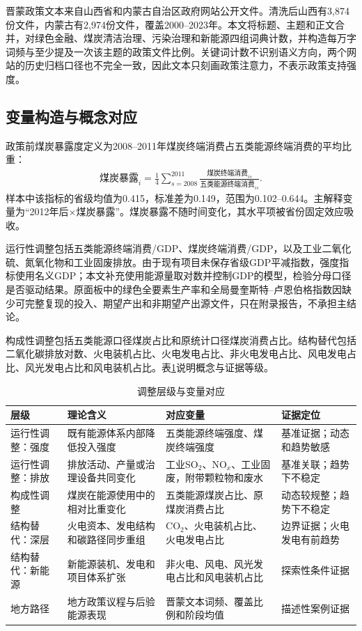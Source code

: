 \documentclass[UTF8,12pt]{ctexart}
\begin{document}
晋蒙政策文本来自山西省和内蒙古自治区政府网站公开文件。清洗后山西有3,874份文件，内蒙古有2,974份文件，覆盖2000--2023年。本文将标题、主题和正文合并，对绿色金融、煤炭清洁治理、污染治理和新能源四组词典计数，并构造每万字词频与至少提及一次该主题的政策文件比例。关键词计数不识别语义方向，两个网站的历史归档口径也不完全一致，因此文本只刻画政策注意力，不表示政策支持强度。

\subsection{变量构造与概念对应}

政策前煤炭暴露度定义为2008--2011年煤炭终端消费占五类能源终端消费的平均比重：
\begin{equation}
\begin{aligned}
\text{煤炭暴露}_{i}
  =\frac{1}{4}\sum_{s=2008}^{2011}
  \frac{\text{煤炭终端消费}_{is}}
  {\text{五类能源终端消费}_{is}}.
\end{aligned}
\end{equation}
样本中该指标的省级均值为0.415，标准差为0.149，范围为0.102--0.644。主解释变量为“2012年后×煤炭暴露”。煤炭暴露不随时间变化，其水平项被省份固定效应吸收。

运行性调整包括五类能源终端消费/GDP、煤炭终端消费/GDP，以及工业二氧化硫、氮氧化物和工业固废排放。由于现有项目未保存省级GDP平减指数，强度指标使用名义GDP；本文补充使用能源量取对数并控制GDP的模型，检验分母口径是否驱动结果。原面板中的绿色全要素生产率和全局曼奎斯特--卢恩伯格指数因缺少可完整复现的投入、期望产出和非期望产出源文件，只在附录报告，不承担主结论。

构成性调整包括五类能源口径煤炭占比和原统计口径煤炭消费占比。结构替代包括二氧化碳排放对数、火电装机占比、火电发电占比、非火电发电占比、风电发电占比、风光发电占比和风电装机占比。表\ref{tab:mapping}说明概念与证据等级。

\begin{table}[H]
\centering
\caption{调整层级与变量对应}
\label{tab:mapping}
\begin{tabularx}{\textwidth}{p{2.7cm}p{4.5cm}X p{2.5cm}}
\toprule
层级 & 理论含义 & 对应变量 & 证据定位 \\
\midrule
运行性调整：强度 & 既有能源体系内部降低投入强度 & 五类能源终端强度、煤炭终端强度 & 基准证据；动态和趋势敏感 \\
运行性调整：排放 & 排放活动、产量或治理设备共同变化 & 工业SO$_2$、NO$_x$、工业固废，附带颗粒物和废水 & 基准关联；趋势下不稳定 \\
构成性调整 & 煤炭在能源使用中的相对比重变化 & 五类能源煤炭占比、原煤炭消费占比 & 动态较规整；趋势下不稳定 \\
结构替代：深层 & 火电资本、发电结构和碳路径同步重组 & CO$_2$、火电装机占比、火电发电占比 & 边界证据；火电发电有前趋势 \\
结构替代：新能源 & 新能源装机、发电和项目体系扩张 & 非火电、风电、风光发电占比和风电装机占比 & 探索性条件证据 \\
地方路径 & 地方政策议程与后验能源表现 & 晋蒙文本词频、覆盖比例和阶段均值 & 描述性案例证据 \\
\bottomrule
\end{tabularx}
\end{table}
\end{document}
